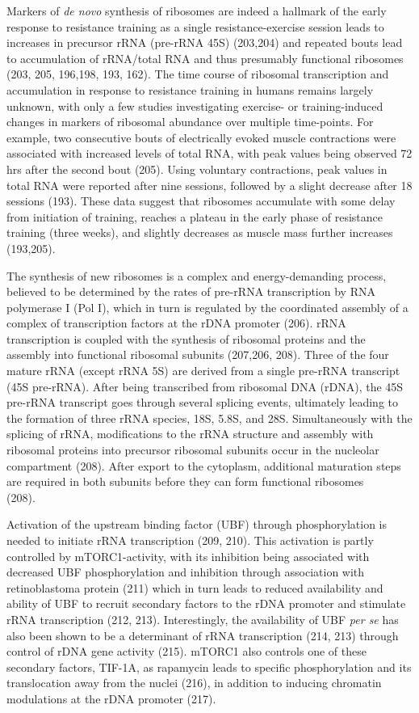 \documentclass[twoside,10pt]{gihclass} %
\begin{document}
Markers of \emph{de novo} synthesis of ribosomes are indeed a hallmark of the early response to resistance training as a single resistance-exercise session leads to increases in precursor rRNA (pre-rRNA 45S)
(203,204)
and repeated bouts lead to accumulation of rRNA/total RNA and thus presumably functional ribosomes
(203, 205, 196,198, 193, 162).
The time course of ribosomal transcription and accumulation in response to resistance training in humans remains largely unknown, with only a few studies investigating exercise- or training-induced changes in markers of ribosomal abundance over multiple time-points.
For example, two consecutive bouts of electrically evoked muscle contractions were associated with increased levels of total RNA, with peak values being observed 72 hrs after the second bout
(205).
Using voluntary contractions, peak values in total RNA were reported after nine sessions, followed by a slight decrease after 18 sessions (193).
These data suggest that ribosomes accumulate with some delay from initiation of training, reaches a plateau in the early phase of resistance training (three weeks), and slightly decreases as muscle mass further increases
(193,205).

The synthesis of new ribosomes is a complex and energy-demanding process, believed to be determined by the rates of pre-rRNA transcription by RNA polymerase I (Pol I), which in turn is regulated by the coordinated assembly of a complex of transcription factors at the rDNA promoter
(206).
rRNA transcription is coupled with the synthesis of ribosomal proteins and the assembly into functional ribosomal subunits
(207,206, 208).
Three of the four mature rRNA (except rRNA 5S) are derived from a single pre-rRNA transcript (45S pre-rRNA). After being transcribed from ribosomal DNA (rDNA), the 45S pre-rRNA transcript goes through several splicing events, ultimately leading to the formation of three rRNA species, 18S, 5.8S, and 28S. Simultaneously with the splicing of rRNA, modifications to the rRNA structure and assembly with ribosomal proteins into precursor ribosomal subunits occur in the nucleolar compartment
(208).
After export to the cytoplasm, additional maturation steps are required in both subunits before they can form functional ribosomes\\
(208).

Activation of the upstream binding factor (UBF) through phosphorylation is needed to initiate rRNA transcription
(209, 210).
This activation is partly controlled by mTORC1-activity, with its inhibition being associated with decreased UBF phosphorylation and inhibition through association with retinoblastoma protein
(211)
which in turn leads to reduced availability and ability of UBF to recruit secondary factors to the rDNA promoter and stimulate rRNA transcription
(212, 213).
Interestingly, the availability of UBF \emph{per se} has also been shown to be a determinant of rRNA transcription
(214, 213)
through control of rDNA gene activity
(215).
mTORC1 also controls one of these secondary factors, TIF-1A, as rapamycin leads to specific phosphorylation and its translocation away from the nuclei
(216),
in addition to inducing chromatin modulations at the rDNA promoter
(217).
\end{document}
